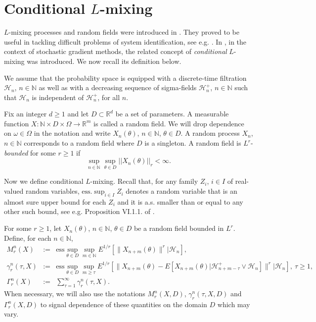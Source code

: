 \documentclass[a4paper]{article}
\begin{document}
\section{Conditional $L$-mixing}\label{lm}

$L$-mixing processes and random fields
were introduced in \cite{laci1}. They proved to be useful in
tackling difficult problems of system identification, see e.g. \cite{laci6,laci4,laci5,laci7,q}. In
\cite{4}, in the context of stochastic gradient methods, the related
concept of \emph{conditional} $L$-mixing
was introduced. We now recall its definition below.

We assume that the probability space is equipped
with a discrete-time filtration $\mathcal{H}_n$, $n\in\mathbb{N}$ as well as with a decreasing sequence of sigma-fields $\mathcal{H}_n^+$, $n\in\mathbb{N}$ such that $\mathcal{H}_n$ is
independent of $\mathcal{H}_n^+$, for all $n$.

Fix an integer $d\geq 1$ and let $D\subset \mathbb{R}^d$ be a set of parameters. A measurable function
$X:\mathbb{N}\times D\times\Omega\to\mathbb{R}^m$ is called a random field. We will drop dependence on $\omega\in\Omega$ in the notation and write
$X_n(\theta)$, $n\in\mathbb{N}$, $\theta\in D$. A random
process $X_n$, $n\in\mathbb{N}$ corresponds to a random field where $D$
is a singleton. A random field is $L^r$-\emph{bounded} for some $r\geq 1$
if
$$
\sup_{n\in\mathbb{N}}\sup_{\theta\in D} ||X_n(\theta)||_r<\infty.
$$

Now we define conditional $L$-mixing.
Recall that, for any family $Z_i$, $i\in I$ of real-valued random variables, $\mathrm{ess.}\sup_{i\in I} Z_i$
denotes a random variable that is an almost sure upper bound for each $Z_i$ and it is a.s.
smaller than or equal to any other such bound, see e.g. Proposition VI.1.1. of \cite{neveu}.


For some $r\geq 1$, let $X_n(\theta)$, $n\in\mathbb{N}$, $\theta\in D$ be a random field bounded in $L^r$.
Define, for each $n\in\mathbb{N}$,
\begin{eqnarray*}
	M^{n}_r(X) &:=& \mathrm{ess}\sup_{\theta\in D}\sup_{m \in\mathbb{N}}
	E^{1/r}[\|X_{n+m}(\theta)\|^r\big\vert\mathcal{H}_n],\\
	\gamma^{n}_r(\tau,X)&:=& \mathrm{ess}\sup_{\theta\in D}\sup_{m\geq\tau}
	E^{1/r}[\|X_{n+m}(\theta)-E[X_{n+m}(\theta)\vert \mathcal{H}_{n+m-\tau}^+\vee \mathcal{H}_n]\|^r\big\vert
	\mathcal{H}_n],\ \tau\geq 1,\\
	\Gamma^{n}_r(X) &:=&\sum_{\tau= 1}^{\infty}\gamma^{n}_r(\tau,X).
\end{eqnarray*}
When necessary, we will also use the notations $M^{n}_r(X,D)$,
$\gamma^{n}_r(\tau,X,D)$ and $\Gamma^{n}_r(X,D)$ to signal dependence of
these quantities on the domain $D$ which may vary.
\end{document}
